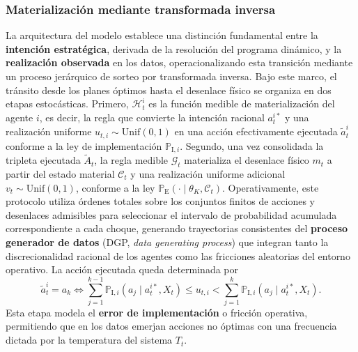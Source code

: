 \documentclass[12pt]{article}
\theoremstyle{definition}
\theoremstyle{remark}
\newcommand{\ProbE}{\mathbb{P}_{\mathrm{E}}}
\newcommand{\ProbI}[1]{\mathbb{P}_{\mathrm{I},#1}}
\newcommand{\Unif}{\mathrm{Unif}}
\newcommand{\1}{\mathbf{1}}
\begin{document}
\subsubsection{Materialización mediante transformada inversa}
\label{sec:mecanismo-realizacion}

\noindent La arquitectura del modelo establece una distinción fundamental entre la \textbf{intención estratégica}, derivada de la resolución del programa dinámico, y la \textbf{realización observada} en los datos, operacionalizando esta transición mediante un proceso jerárquico de sorteo por transformada inversa. Bajo este marco, el tránsito desde los planes óptimos hasta el desenlace físico se organiza en dos etapas estocásticas. Primero, $\mathcal{H}_t^i$ es la función medible de materialización del agente $i$, es decir, la regla que convierte la intención racional $a_t^{i\ast}$ y una realización uniforme $u_{t,i}\sim\Unif(0,1)$ en una acción efectivamente ejecutada $\tilde{a}_t^i$ conforme a la ley de implementación $\ProbI{i}$. Segundo, una vez consolidada la tripleta ejecutada $\tilde{A}_t$, la regla medible $\mathcal{G}_t$ materializa el desenlace físico $m_t$ a partir del estado material $\mathcal C_t$ y una realización uniforme adicional $v_t\sim\Unif(0,1)$, conforme a la ley $\ProbE(\cdot\mid\theta_K,\mathcal C_t)$. Operativamente, este protocolo utiliza órdenes totales sobre los conjuntos finitos de acciones y desenlaces admisibles para seleccionar el intervalo de probabilidad acumulada correspondiente a cada choque, generando trayectorias consistentes del \textbf{proceso generador de datos} \textup{(}DGP, \textit{data generating process}\textup{)} que integran tanto la discrecionalidad racional de los agentes como las fricciones aleatorias del entorno operativo. La acción ejecutada queda determinada por
\begin{equation}
\label{eq:sorteo-individual}
\tilde{a}_t^i = a_k \iff \sum_{j=1}^{k-1} \ProbI{i}(a_j \mid a_t^{i\ast}, X_t) \le u_{t,i} < \sum_{j=1}^{k} \ProbI{i}(a_j \mid a_t^{i\ast}, X_t).
\end{equation}
Esta etapa modela el \textbf{error de implementación} o fricción operativa, permitiendo que en los datos emerjan acciones no óptimas con una frecuencia dictada por la temperatura del sistema $T_t$.
\end{document}
